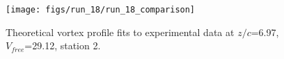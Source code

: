 \begin{figure}[H]
\centering
\texttt{[image: figs/run\_18/run\_18\_comparison]}
\caption{Theoretical vortex profile fits to experimental data at $z/c$=6.97, $V_{free}$=29.12, station 2.}
\label{fig:run_18_comparison}
\end{figure}


